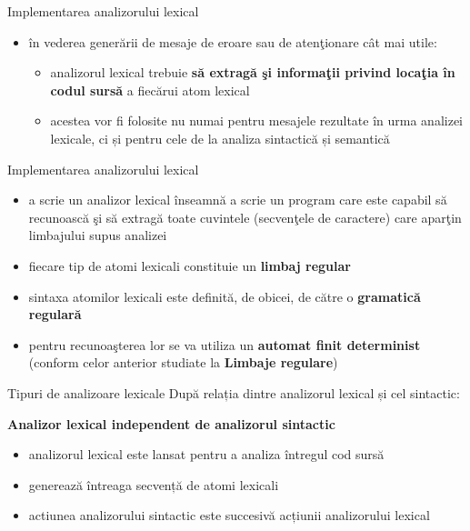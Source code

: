 \documentclass[pdf]{beamer}
\begin{document}
\begin{frame}{Implementarea analizorului lexical}
\begin{itemize}
\item
în vederea generării de mesaje de eroare sau de atenţionare cât mai utile:
\begin{itemize}
\item
analizorul lexical trebuie \textbf{să extragă şi informaţii privind locaţia în codul sursă} a fiecărui atom lexical
\item
acestea vor fi folosite nu numai pentru mesajele rezultate în urma analizei lexicale, ci și pentru cele de la analiza sintactică și semantică
\end{itemize}
\end{itemize}
\end{frame}



\begin{frame}{Implementarea analizorului lexical}
\begin{itemize}
\item
a scrie un analizor lexical înseamnă a scrie un program care este capabil să recunoască şi să extragă toate cuvintele (secvenţele de caractere) care aparţin limbajului supus analizei

\item
fiecare tip de atomi lexicali constituie un \textbf{limbaj regular}

\item
sintaxa atomilor lexicali este definită, de obicei, de către o \textbf{gramatică regulară}

\item
pentru recunoaşterea lor se va utiliza un \textbf{automat finit determinist} (conform celor anterior studiate la \textbf{Limbaje regulare})
\end{itemize}
\end{frame}



\begin{frame}{Tipuri de analizoare lexicale}
După relația dintre analizorul lexical și cel sintactic:
\newline

\textbf{Analizor lexical independent de analizorul sintactic}

\begin{itemize}
\item
analizorul lexical este lansat pentru a analiza întregul cod sursă

\item
generează întreaga secvență de atomi lexicali
\item
actiunea analizorului sintactic este succesivă acțiunii analizorului lexical
\end{itemize}
\end{frame}
\end{document}
